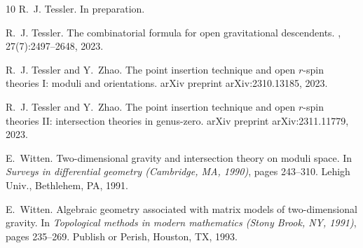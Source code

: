 \documentclass[11pt]{amsart}
\theoremstyle{definition}
\theoremstyle{remark}
\newcommand{\<}{\left<}
\renewcommand{\>}{\right>}
\numberwithin{equation}{section}
\begin{document}
\begin{thebibliography}{10}
R.~J. Tessler.
\newblock In preparation.

R.~J. Tessler.
\newblock The combinatorial formula for open gravitational descendents.
, 27(7):2497--2648, 2023.

R.~J. Tessler and Y.~Zhao.
\newblock The point insertion technique and open $r$-spin theories {I}: moduli
  and orientations.
\newblock arXiv preprint arXiv:2310.13185, 2023.

R.~J. Tessler and Y.~Zhao.
\newblock The point insertion technique and open $r$-spin theories {II}:
  intersection theories in genus-zero.
\newblock arXiv preprint arXiv:2311.11779, 2023.

E.~Witten.
\newblock Two-dimensional gravity and intersection theory on moduli space.
\newblock In {\em Surveys in differential geometry ({C}ambridge, {MA}, 1990)},
  pages 243--310. Lehigh Univ., Bethlehem, PA, 1991.

E.~Witten.
\newblock Algebraic geometry associated with matrix models of two-dimensional
  gravity.
\newblock In {\em Topological methods in modern mathematics ({S}tony {B}rook,
  {NY}, 1991)}, pages 235--269. Publish or Perish, Houston, TX, 1993.
\end{thebibliography}
\end{document}
